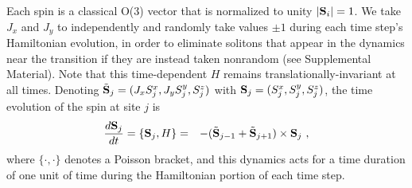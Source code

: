 \documentclass[twocolumn,amsmath,amssymb,floatfix,superscriptaddress,aps,prl]{revtex4-2}
\newcommand{\david}[1]{\textcolor{cyan}{#1}}
\begin{document}
Each spin is a classical O(3) vector that is normalized to unity $|{\bf S}_i|=1$.  We take $J_x$ and $J_y$ to independently and randomly take values $\pm 1$ during each time step's Hamiltonian evolution, in order to eliminate solitons that appear in the dynamics near the transition if they are instead taken nonrandom (see Supplemental Material).  Note that this time-dependent $H$ remains translationally-invariant at all times.
Denoting $\tilde {\bf S}_j=(J_x S_j^x,J_y S_j^y,S_j^z)$ with $ {\bf S}_j=(S_j^x, S_j^y,S_j^z)$,
the time evolution of the spin at site $j$ is
\begin{eqnarray}
    \frac{d{\bf S}_j}{dt}&=\{{\bf S}_j,H\}=&-(\tilde {\bf S}_{j-1}+\tilde {\bf S}_{j+1})\times {\bf S}_{j}~,  
    \label{eq:EOM}
\end{eqnarray}
where $\{\cdot,\cdot\}$ denotes a Poisson bracket, and this dynamics acts for a time duration of one unit of time during the Hamiltonian portion of each time step.

%

\end{document}
